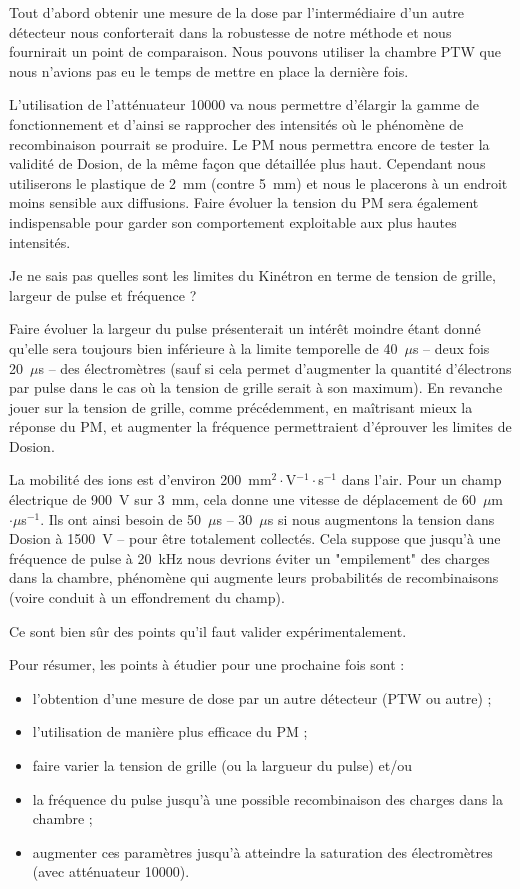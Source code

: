 \documentclass[a4paper,11pt]{article}
\begin{document}
Tout d'abord obtenir une mesure de la dose par l'intermédiaire d'un autre détecteur nous conforterait dans la robustesse de notre méthode et nous fournirait un point de comparaison.
Nous pouvons utiliser la chambre PTW que nous n'avions pas eu le temps de mettre en place la dernière fois.

L'utilisation de l'atténuateur 10000 va nous permettre d'élargir la gamme de fonctionnement et d'ainsi se rapprocher des intensités où le phénomène de recombinaison pourrait se produire.
Le PM nous permettra encore de tester la validité de Dosion, de la même façon que détaillée plus haut.
Cependant nous utiliserons le plastique de 2~mm (contre 5~mm) et nous le placerons à un endroit moins sensible aux diffusions.
Faire évoluer la tension du PM sera également indispensable pour garder son comportement exploitable aux plus hautes intensités.

Je ne sais pas quelles sont les limites du Kinétron en terme de tension de grille, largeur de pulse et fréquence ?

Faire évoluer la largeur du pulse présenterait un intérêt moindre étant donné qu'elle sera toujours bien inférieure à la limite temporelle de 40~$\mu$s -- deux fois 20~$\mu$s -- des électromètres (sauf si cela permet d'augmenter la quantité d'électrons par pulse dans le cas où la tension de grille serait à son maximum).
En revanche jouer sur la tension de grille, comme précédemment, en maîtrisant mieux la réponse du PM, et augmenter la fréquence permettraient d'éprouver les limites de Dosion.

La mobilité des ions est d'environ 200~mm$^2\cdot$V$^{-1}\cdot$s$^{-1}$ dans l'air.
Pour un champ électrique de 900~V sur 3~mm, cela donne une vitesse de déplacement de 60~$\mu$m$\cdot\mu$s$^{-1}$.
Ils ont ainsi besoin de 50~$\mu$s -- 30~$\mu$s si nous augmentons la tension dans Dosion à 1500~V -- pour être totalement collectés.
Cela suppose que jusqu'à une fréquence de pulse à 20~kHz nous devrions éviter un "empilement" des charges dans la chambre, phénomène qui augmente leurs probabilités de recombinaisons (voire conduit à un effondrement du champ).

Ce sont bien sûr des points qu'il faut valider expérimentalement.

Pour résumer, les points à étudier pour une prochaine fois sont :
\begin{itemize}
\item l'obtention d'une mesure de dose par un autre détecteur (PTW ou autre) ;
\item l'utilisation de manière plus efficace du PM ;
\item faire varier la tension de grille (ou la largueur du pulse) et/ou
\item la fréquence du pulse jusqu'à une possible recombinaison des charges dans la chambre ;
\item augmenter ces paramètres jusqu'à atteindre la saturation des électromètres (avec atténuateur 10000).
\end{itemize}

\end{document}
